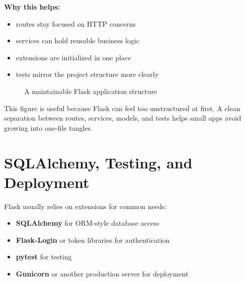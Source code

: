\documentclass[12pt, a4paper, oneside]{book}
\begin{document}
\textbf{Why this helps:}
\begin{itemize}[leftmargin=2em]
    \item routes stay focused on HTTP concerns
    \item services can hold reusable business logic
    \item extensions are initialized in one place
    \item tests mirror the project structure more clearly
\end{itemize}

\begin{figure}[H]
\centering
{}
\caption{A maintainable Flask application structure}
\label{fig:flask-structure}
\end{figure}

This figure is useful because Flask can feel too unstructured at first. A clean separation between routes, services, models, and tests helps small apps avoid growing into one-file tangles.

\section{SQLAlchemy, Testing, and Deployment}

Flask usually relies on extensions for common needs:
\begin{itemize}[leftmargin=2em]
    \item \textbf{SQLAlchemy} for ORM-style database access
    \item \textbf{Flask-Login} or token libraries for authentication
    \item \textbf{pytest} for testing
    \item \textbf{Gunicorn} or another production server for deployment
\end{itemize}
\end{document}
